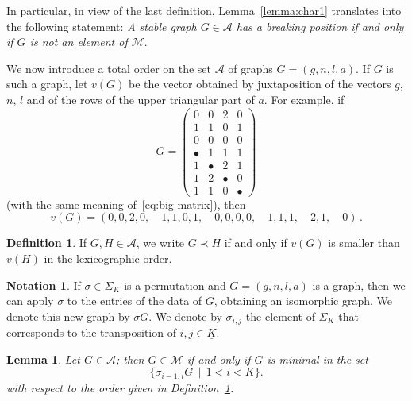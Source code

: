 \documentclass{amsart}
\theoremstyle{plain}
\newtheorem{lemma}[theorem]{Lemma}
\theoremstyle{definition}
\newtheorem{definition}[theorem]{Definition}
\newtheorem{notation}[theorem]{Notation}
\newcommand{\ubar}[1]{\underline{#1}}
\begin{document}
In particular, in view of the last definition, Lemma~\ref{lemma:char1} translates into the following statement: \emph{A stable graph $G \in \mathcal{A}$ has a breaking position
  if and only if $G$ is not an element of $\mathcal{M}$}.

We now introduce a total order on the set $\mathcal{A}$ of graphs $G =
(g,n,l,a)$. If $G$ is such a graph, let $v(G)$ be the vector obtained
by juxtaposition of the vectors $g$, $n$, $l$ and of the rows of the
upper triangular part of $a$. For example, if
\[
  G = \begin{pmatrix}
    0 & 0 & 2 & 0\\
    1 & 1 & 0 & 1\\
    0 & 0 & 0 & 0\\
    \hline
    \bullet & 1 & 1 & 1\\
    1 & \bullet & 2 & 1\\
    1 & 2 & \bullet & 0\\
    1 & 1 & 0 & \bullet
  \end{pmatrix}
\]
(with the same meaning of~\ref{eq:big matrix}), then
\[
v(G) = (0, 0, 2, 0,\quad 1, 1, 0, 1,\quad 0, 0, 0, 0,\quad 1, 1,
1,\quad 2, 1,\quad 0)\,\text{.}
\]

\begin{definition} \label{def:order} If $G, H \in \mathcal{A}$, we
  write $G \prec H$ if and only if $v(G)$ is smaller than $v(H)$ in
  the lexicographic order.
\end{definition}

\begin{notation}
  If $\sigma \in \Sigma_K$ is a permutation and $G = (g, n, l, a)$ is
  a graph, then we can apply $\sigma$ to the entries of the data of
  $G$, obtaining an isomorphic graph. We denote this new graph by
  $\sigma G$. We denote by $\sigma_{i,j}$ the element of $\Sigma_K$ that corresponds to the transposition of $i, j \in \ubar{K}$.
\end{notation}

\begin{lemma}\label{lemma:char2}
  Let $G \in \mathcal{A}$; then $G \in \mathcal{M}$ if and only if $G$
  is minimal in the set
  \[
  \bigl\{ \sigma_{i-1,i} G \,\mid\, 1<i<K \bigr\}\text{.}
  \]
  with respect to the order given in Definition~\ref{def:order}.
\end{lemma}
\end{document}

